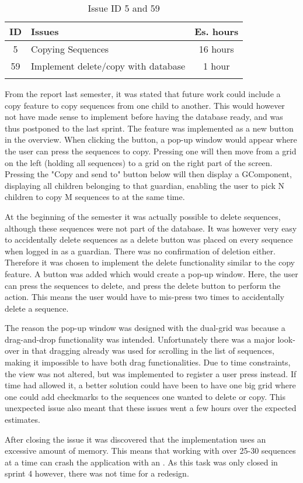 \begin{longtable} { | c | p{12cm} | c | } 
\hline
	ID 	&	Issues	&		 Es. hours \\\hline
	5	&	Copying Sequences	&	16 hours	\\\hline
	59  &	Implement delete/copy with database	&	1 hour \\\hline
\caption{Issue ID 5 and 59}
\label{tab:spr4_copyingsequences}
\end{longtable}

From the report last semester, it was stated that future work could include a copy feature to copy sequences from one child to another. This would however not have made sense to implement before having the database ready, and was thus postponed to the last sprint. The feature was implemented as a new button in the overview. When clicking the button, a pop-up window would appear where the user can press the sequences to copy. Pressing one will then move from a grid on the left (holding all sequences) to a grid on the right part of the screen. Pressing the "Copy and send to" button below will then display a GComponent, displaying all children belonging to that guardian, enabling the user to pick N children to copy M sequences to at the same time. 

At the beginning of the semester it was actually possible to delete sequences, although these sequences were not part of the database. It was however very easy to accidentally delete sequences as a delete button was placed on every sequence when logged in as a guardian. There was no confirmation of deletion either.  Therefore it was chosen to implement the delete functionality similar to the copy feature. A button was added which would create a pop-up window. Here, the user can press the sequences to delete, and press the delete button to perform the action. This means the user would have to mis-press two times to accidentally delete a sequence.

The reason the pop-up window was designed with the dual-grid was because a drag-and-drop functionality was intended. Unfortunately there was a major look-over in that dragging already was used for scrolling in the list of sequences, making it impossible to have both drag functionalities. Due to time constraints, the view was not altered, but was implemented to register a user press instead. If time had allowed it, a better solution could have been to have one big grid where one could add checkmarks to the sequences one wanted to delete or copy. This unexpected issue also meant that these issues went a few hours over the expected estimates.

After closing the issue it was discovered that the implementation uses an excessive amount of memory. This means that working with over 25-30 sequences at a time can crash the application with an . As this task was only closed in sprint 4 however, there was not time for a redesign.
